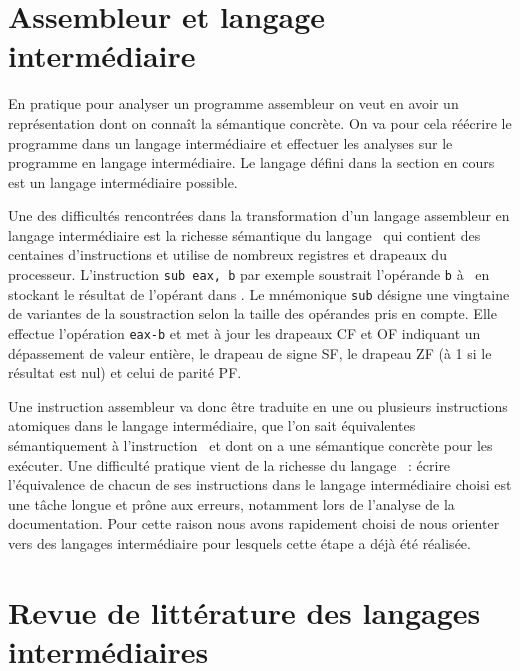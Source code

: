 \section{Assembleur et langage intermédiaire}
En pratique pour analyser un programme assembleur on veut en avoir un représentation dont on connaît la sémantique concrète.
On va pour cela réécrire le programme dans un langage intermédiaire et effectuer les analyses sur le programme en langage intermédiaire. Le langage défini dans la section en cours est un langage intermédiaire possible.

Une des difficultés rencontrées dans la transformation d'un langage assembleur en langage intermédiaire est la richesse sémantique du langage \xq\ qui contient des centaines d'instructions et utilise de nombreux registres et drapeaux du processeur.
L'instruction \texttt{sub eax, b} par exemple soustrait l'opérande \texttt{b} à \eax\  en stockant le résultat de l'opérant dans \eax.
Le mnémonique \texttt{sub} désigne une vingtaine de variantes de la soustraction selon la taille des opérandes pris en compte. Elle effectue l'opération \texttt{eax-b} et met à jour les drapeaux CF et OF indiquant un dépassement de valeur entière, le drapeau de signe SF, le drapeau ZF (à 1 si le résultat est nul) et celui de parité PF.

Une instruction assembleur va donc être traduite en une ou plusieurs instructions atomiques dans le langage intermédiaire, que l'on sait équivalentes sémantiquement à l'instruction \xq\ et dont on a une sémantique concrète pour les exécuter.
Une difficulté pratique vient de la richesse du langage \xq\ : écrire l'équivalence de chacun de ses instructions dans le langage intermédiaire choisi est une tâche longue et prône aux erreurs, notamment lors de l'analyse de la documentation. 
Pour cette raison nous avons rapidement choisi de nous orienter vers des langages intermédiaire pour lesquels cette étape a déjà été réalisée.

\section{Revue de littérature des langages intermédiaires}



